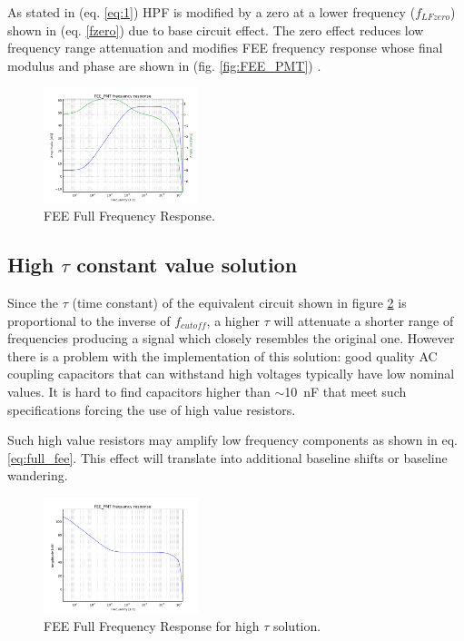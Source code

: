 \documentclass[a4paper, 10pt, oneside, twocolumn, 3p]{elsarticle}
\begin{document}
\par As stated in (eq. \ref{eq:1}) HPF is modified by a zero at a lower frequency  ($f_{LFzero}$) shown in (eq. \ref{fzero}) due to base circuit effect. The zero effect reduces low frequency range attenuation and modifies FEE frequency response whose final modulus and phase are shown in (fig. \ref{fig:FEE_PMT}) .


\begin{figure}
	\begin{center}
		\includegraphics[width=0.4\textwidth]{./figures/FEEfull_freq.png}
		\caption{FEE Full Frequency Response.}
		\label{fig:Full_Freq}
	\end{center}
\end{figure}


\subsection {High $\tau$ constant value solution}

Since the $\tau$ (time constant) of the equivalent circuit shown in figure \ref{fig:Full_Freq_high_tau} is proportional to the inverse of $f_{cutoff}$, a higher $\tau$ will attenuate a shorter range of frequencies producing a signal which closely resembles the original one. However there is a problem with the implementation of this solution: good quality AC coupling capacitors that can withstand high voltages typically have low nominal values. It is hard to find capacitors higher than $\sim$10~nF that meet such specifications forcing the use of high value resistors. 

Such high value resistors may amplify low frequency components as shown in eq. \ref{eq:full_fee}. This effect will translate into additional baseline shifts or baseline wandering. 

\begin{figure}
	\begin{center}
		\includegraphics[width=0.4\textwidth]{./figures/tau_badidea.png}
		\caption{FEE Full Frequency Response for high $\tau$ solution.}
		\label{fig:Full_Freq_high_tau}
	\end{center}
\end{figure}
\end{document}
